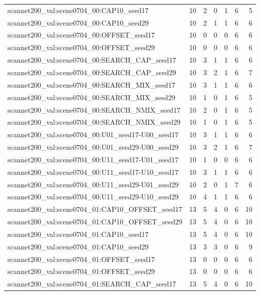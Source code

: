 \begin{table}[t]
\begin{tabular}{lrrrrrr}
scannet200\_val:scene0704\_00:CAP10\_seed17 & 10 & 2 & 0 & 1 & 6 & 5 \\
scannet200\_val:scene0704\_00:CAP10\_seed29 & 10 & 2 & 1 & 1 & 6 & 6 \\
scannet200\_val:scene0704\_00:OFFSET\_seed17 & 10 & 0 & 0 & 0 & 6 & 6 \\
scannet200\_val:scene0704\_00:OFFSET\_seed29 & 10 & 0 & 0 & 0 & 6 & 6 \\
scannet200\_val:scene0704\_00:SEARCH\_CAP\_seed17 & 10 & 3 & 1 & 1 & 6 & 6 \\
scannet200\_val:scene0704\_00:SEARCH\_CAP\_seed29 & 10 & 3 & 2 & 1 & 6 & 7 \\
scannet200\_val:scene0704\_00:SEARCH\_MIX\_seed17 & 10 & 3 & 1 & 1 & 6 & 6 \\
scannet200\_val:scene0704\_00:SEARCH\_MIX\_seed29 & 10 & 1 & 0 & 1 & 6 & 5 \\
scannet200\_val:scene0704\_00:SEARCH\_NMIX\_seed17 & 10 & 2 & 0 & 1 & 6 & 5 \\
scannet200\_val:scene0704\_00:SEARCH\_NMIX\_seed29 & 10 & 1 & 0 & 1 & 6 & 5 \\
scannet200\_val:scene0704\_00:U01\_seed17-U00\_seed17 & 10 & 3 & 1 & 1 & 6 & 6 \\
scannet200\_val:scene0704\_00:U01\_seed29-U00\_seed29 & 10 & 3 & 2 & 1 & 6 & 7 \\
scannet200\_val:scene0704\_00:U11\_seed17-U01\_seed17 & 10 & 1 & 0 & 0 & 6 & 6 \\
scannet200\_val:scene0704\_00:U11\_seed17-U10\_seed17 & 10 & 3 & 1 & 1 & 6 & 6 \\
scannet200\_val:scene0704\_00:U11\_seed29-U01\_seed29 & 10 & 2 & 0 & 1 & 7 & 6 \\
scannet200\_val:scene0704\_00:U11\_seed29-U10\_seed29 & 10 & 4 & 1 & 1 & 6 & 6 \\
scannet200\_val:scene0704\_01:CAP10\_OFFSET\_seed17 & 13 & 5 & 4 & 0 & 6 & 10 \\
scannet200\_val:scene0704\_01:CAP10\_OFFSET\_seed29 & 13 & 5 & 4 & 0 & 6 & 10 \\
scannet200\_val:scene0704\_01:CAP10\_seed17 & 13 & 5 & 4 & 0 & 6 & 10 \\
scannet200\_val:scene0704\_01:CAP10\_seed29 & 13 & 3 & 3 & 0 & 6 & 9 \\
scannet200\_val:scene0704\_01:OFFSET\_seed17 & 13 & 0 & 0 & 0 & 6 & 6 \\
scannet200\_val:scene0704\_01:OFFSET\_seed29 & 13 & 0 & 0 & 0 & 6 & 6 \\
scannet200\_val:scene0704\_01:SEARCH\_CAP\_seed17 & 13 & 5 & 4 & 0 & 6 & 10 \\

\end{tabular}
\end{table}
